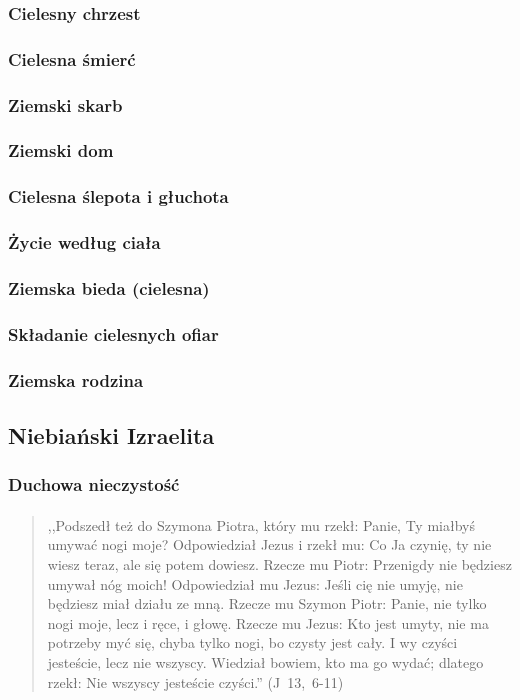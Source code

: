 \documentclass[10pt,a4paper,oneside]{article}
\begin{document}
\subsubsection{Cielesny chrzest}
\subsubsection{Cielesna śmierć}
\subsubsection{Ziemski skarb}
\subsubsection{Ziemski dom}
\subsubsection{Cielesna ślepota i głuchota}
\subsubsection{Życie według ciała}
\subsubsection{Ziemska bieda (cielesna)}
\subsubsection{Składanie cielesnych ofiar}
\subsubsection{Ziemska rodzina}
\subsection{Niebiański Izraelita}
\subsubsection{Duchowa nieczystość}
\paragraph{}
\begin{quote}
,,Podszedł też do Szymona Piotra, który mu rzekł: Panie, Ty miałbyś umywać nogi moje? Odpowiedział Jezus i rzekł mu: Co Ja czynię, ty nie wiesz teraz, ale się potem dowiesz. Rzecze mu Piotr: Przenigdy nie będziesz umywał nóg moich! Odpowiedział mu Jezus: Jeśli cię nie umyję, nie będziesz miał działu ze mną. Rzecze mu Szymon Piotr: Panie, nie tylko nogi moje, lecz i ręce, i głowę. Rzecze mu Jezus: Kto jest umyty, nie ma potrzeby myć się, chyba tylko nogi, bo czysty jest cały. I wy czyści jesteście, lecz nie wszyscy. Wiedział bowiem, kto ma go wydać; dlatego rzekł: Nie wszyscy jesteście czyści.'' \mbox{(J 13, 6-11)}
\end{quote}
\end{document}
